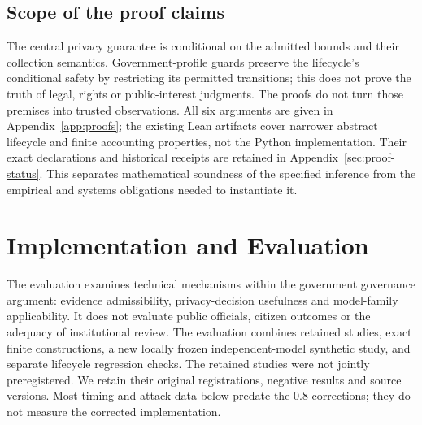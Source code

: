 \documentclass[conference,compsoc]{IEEEtran}
\begin{document}


\subsection{Scope of the proof claims}
The central privacy guarantee is conditional on the admitted bounds and their
collection semantics. Government-profile guards preserve the lifecycle's
conditional safety by restricting its permitted transitions; this does not
prove the truth of legal, rights or public-interest judgments. The proofs do not turn those premises into trusted
observations. All six arguments are given in Appendix~\ref{app:proofs};
the existing Lean artifacts cover narrower abstract lifecycle and finite
accounting properties, not the Python implementation. Their exact declarations
and historical receipts are retained in Appendix~\ref{sec:proof-status}.
This separates mathematical soundness of the specified inference from
the empirical and systems obligations needed to instantiate it.




\section{Implementation and Evaluation}
\label{sec:methods}
The evaluation examines technical mechanisms within the government governance
argument: evidence admissibility, privacy-decision usefulness and model-family
applicability. It does not evaluate public officials, citizen outcomes or the
adequacy of institutional review. The evaluation combines retained studies,
exact finite constructions, a new locally frozen independent-model synthetic
study, and separate lifecycle regression checks. The retained studies were
not jointly preregistered. We retain their original registrations,
negative results and source versions. Most timing and attack data below
predate the 0.8 corrections; they do not measure the corrected implementation.
\end{document}
